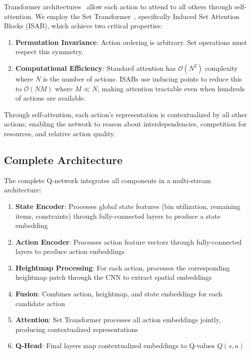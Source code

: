 Transformer architectures~\cite{vaswani2017attention} allow each action to attend to all others through self-attention. We employ the Set Transformer~\cite{lee2019set}, specifically Induced Set Attention Blocks (ISAB), which achieve two critical properties:

\begin{enumerate}
    \item \textbf{Permutation Invariance}: Action ordering is arbitrary. Set operations must respect this symmetry.
    \item \textbf{Computational Efficiency}: Standard attention has $\mathcal{O}(N^2)$ complexity where $N$ is the number of actions. ISABs use inducing points to reduce this to $\mathcal{O}(NM)$ where $M \ll N$, making attention tractable even when hundreds of actions are available.
\end{enumerate}

Through self-attention, each action's representation is contextualized by all other actions, enabling the network to reason about interdependencies, competition for resources, and relative action quality.

\subsection{Complete Architecture}

The complete Q-network integrates all components in a multi-stream architecture:

\begin{enumerate}
    \item \textbf{State Encoder}: Processes global state features (bin utilization, remaining items, constraints) through fully-connected layers to produce a state embedding
    \item \textbf{Action Encoder}: Processes action feature vectors through fully-connected layers to produce action embeddings
    \item \textbf{Heightmap Processing}: For each action, processes the corresponding heightmap patch through the CNN to extract spatial embeddings
    \item \textbf{Fusion}: Combines action, heightmap, and state embeddings for each candidate action
    \item \textbf{Attention}: Set Transformer processes all action embeddings jointly, producing contextualized representations
    \item \textbf{Q-Head}: Final layers map contextualized embeddings to Q-values $Q(s, a)$
\end{enumerate}


